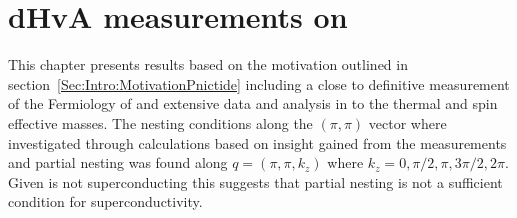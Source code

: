 \chapter{dHvA measurements on \BaFeP{}}
    \label{Sec:ResD}

\begin{chapterabstract}
This chapter presents results based on the motivation outlined in section~\ref{Sec:Intro:MotivationPnictide} including a close to definitive measurement of the Fermiology of \BaFeP{} and extensive data and analysis in to the thermal and spin effective masses. The nesting conditions along the $(\pi,\pi)$ vector where investigated through calculations based on insight gained from the measurements and partial nesting was found along $q=(\pi,\pi,k_z)$ where $k_z=0,\pi/2,\pi,3\pi/2,2\pi$. Given \BaFeP{} is not superconducting this suggests that partial nesting is not a sufficient condition for superconductivity.
\end{chapterabstract}

















